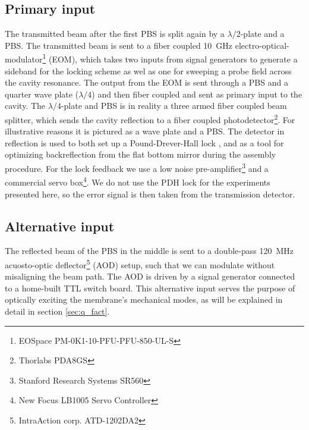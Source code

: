 \subsection{Primary input}
The transmitted beam after the first PBS is split again by a $\lambda/2$-plate and a PBS. The transmitted beam is sent to a fiber coupled \SI{10}{\giga\hertz} electro-optical-modulator\footnote{EOSpace PM-0K1-10-PFU-PFU-850-UL-S} (EOM), which takes two inputs from signal generators to generate a sideband for the locking scheme as wel as one for sweeping a probe field across the cavity resonance. The output from the EOM is sent through a PBS and a quarter wave plate ($\lambda/4$) and then fiber coupled and sent as primary input to the cavity. The $\lambda/4$-plate and PBS is in reality a three armed fiber coupled beam splitter, which sends the cavity reflection to a fiber coupled photodetector\footnote{Thorlabs PDA8GS}. For illustrative reasons it is pictured as a wave plate and a PBS. The detector in reflection is used to both set up a Pound-Drever-Hall lock \cite{black2001}, and as a tool for optimizing backreflection from the flat bottom mirror during the assembly procedure. For the lock feedback we use a low noise pre-amplifier\footnote{Stanford Research Systems SR560} and a commercial servo box\footnote{New Focus LB1005 Servo Controller}. We do not use the PDH lock for the experiments presented here, so the error signal is then taken from the transmission detector.

\subsection{Alternative input}
The reflected beam of the PBS in the middle is sent to a double-pass \SI{120}{\mega\hertz} acuosto-optic deflector\footnote{IntraAction corp. ATD-1202DA2} (AOD) setup, such that we can modulate without misaligning the beam path. The AOD is driven by a signal generator connected to a home-built TTL switch board. This alternative input serves the purpose of optically exciting the membrane's mechanical modes, as will be explained in detail in section \ref{sec:q_fact}.

